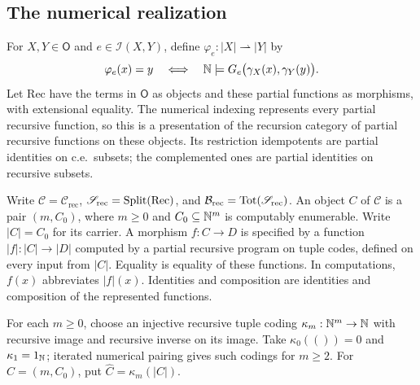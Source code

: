 \subsection{The numerical realization}
\label{subsec:numerical-realization}

For $X,Y\in\mathsf O$ and $e\in\mathcal I(X,Y)$, define
$\varphi_e:|X|\rightharpoonup|Y|$ by
\[
 \varphi_e(x)=y\quad\Longleftrightarrow\quad
 \mathbb N\models G_e\bigl(\gamma_X(x),\gamma_Y(y)\bigr).
\]
Let $\mathrm{Rec}$ have the terms in $\mathsf O$ as objects and
these partial functions as morphisms, with extensional equality.
The numerical indexing represents every partial recursive function,
so this is a presentation of the recursion category of partial recursive
functions on these objects.
Its restriction idempotents are partial identities on c.e.\ subsets;
the complemented ones are partial identities on recursive subsets.

Write $\mathcal C=\mathcal C_{\mathrm{rec}}$,
$\mathscr S_{\mathrm{rec}}=\operatorname{Split}(\mathrm{Rec})$, and
$\mathcal B_{\mathrm{rec}}=\operatorname{Tot}(\mathscr S_{\mathrm{rec}})$.
An object $C$ of $\mathcal C$ is a pair $(m,C_0)$, where
$m\ge0$ and $C_0\subseteq\mathbb N^m$ is computably enumerable.
Write $|C|=C_0$ for its carrier. A morphism $f:C\to D$ is
specified by a function $|f|:|C|\to|D|$ computed by a partial
recursive program on tuple codes, defined on every input from
$|C|$. Equality is equality of these functions. In computations,
$f(x)$ abbreviates $|f|(x)$. Identities and composition are
identities and composition of the represented functions.

For each $m\geq0$, choose an injective recursive tuple coding
$\kappa_m:\mathbb N^m\to\mathbb N$ with recursive image and recursive inverse
on its image. Take $\kappa_0(())=0$ and $\kappa_1=1_{\mathbb N}$;
iterated numerical pairing gives such codings for $m\geq2$.
For $C=(m,C_0)$, put $\widehat C=\kappa_m(|C|)$.


